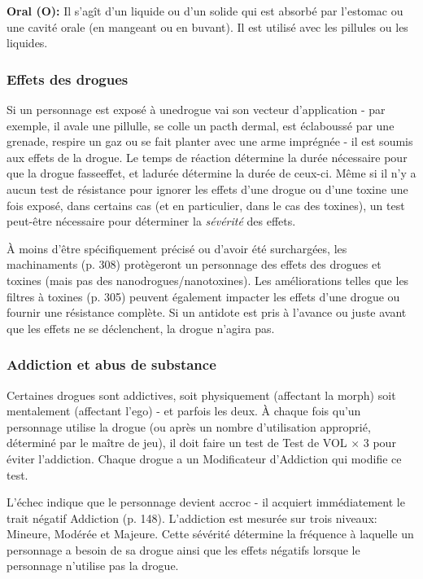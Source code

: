\textbf{Oral (O):} Il s'agît d'un liquide ou d'un solide qui est absorbé par l'estomac ou une cavité orale (en mangeant ou en buvant). Il est utilisé avec les pillules ou les liquides. 

\subsubsection{Effets des drogues} 

Si un personnage est exposé à unedrogue vai son vecteur d'application - par exemple, il avale une pillulle, se colle un pacth dermal, est éclaboussé par une grenade, respire un gaz ou se fait planter avec une arme imprégnée - il est soumis aux effets de la drogue. Le temps de réaction détermine la durée nécessaire pour que la drogue fasseeffet, et ladurée détermine la durée de ceux-ci. Même si il n'y a aucun test de résistance pour ignorer les effets d'une drogue ou d'une toxine une fois exposé, dans certains cas (et en particulier, dans le cas des toxines), un test peut-être nécessaire pour déterminer la \emph{sévérité} des effets.  

À moins d'être spécifiquement précisé ou d'avoir été surchargées, les machinaments (p. 308) protègeront un personnage des effets des drogues et toxines (mais pas des nanodrogues/nanotoxines). Les améliorations telles que les filtres à toxines (p. 305) peuvent également impacter les effets d'une drogue ou fournir une résistance complète. Si un antidote est pris à l'avance ou juste avant que les effets ne se déclenchent, la drogue n'agira pas. 

\subsubsection{Addiction et abus de substance} 

Certaines drogues sont addictives, soit physiquement (affectant la morph) soit mentalement (affectant l'ego) - et parfois les deux. À chaque fois qu'un personnage utilise la drogue (ou après un nombre d'utilisation approprié, déterminé par le maître de jeu), il doit faire un test de Test de VOL $\times$ 3 pour éviter l'addiction. Chaque drogue a un Modificateur d'Addiction qui modifie ce test. 

L'échec indique que le personnage devient accroc - il acquiert immédiatement le trait négatif Addiction (p. 148). L'addiction est mesurée sur trois niveaux: Mineure, Modérée et Majeure. Cette sévérité détermine la fréquence à laquelle un personnage a besoin de sa drogue ainsi que les effets négatifs lorsque le personnage n'utilise pas la drogue. 

